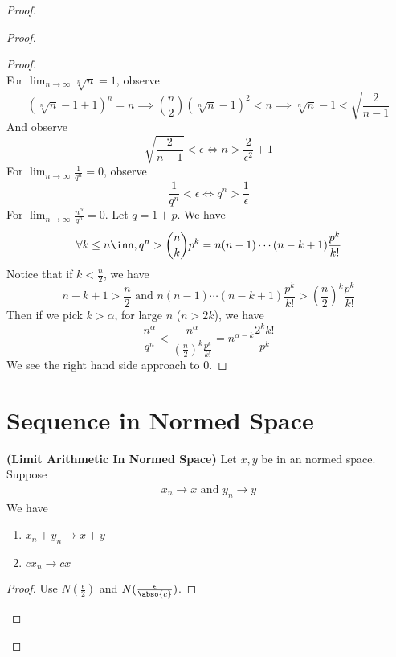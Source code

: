 \documentclass{report}
\begin{document}
\begin{proof}
\begin{proof}
\begin{proof}
\begin{equation*}
\end{equation*}
For $\lim_{n\to\infty}\sqrt[n]{n} =1$, observe
\begin{equation*}
 (\sqrt[n]{n}-1+1)^n=n\implies \binom{n}{2} (\sqrt[n]{n}-1)^2<n\implies \sqrt[n]{n}-1<\sqrt{\frac{2}{n-1}}  
\end{equation*}
And observe
\begin{equation*}
\sqrt{\frac{2}{n-1}}<\epsilon  \iff n>\frac{2}{\epsilon^2}+1  
\end{equation*}
For $\lim_{n\to\infty}\frac{1}{q^n}=0$, observe
\begin{equation*}
\frac{1}{q^n}<\epsilon  \iff  q^n>\frac{1}{\epsilon }
\end{equation*}
For $\lim_{n\to\infty}\frac{n^\alpha }{q^n}=0$. Let $q=1+p$. We have
 \begin{equation*}
\forall k\leq n\inn, q^n>\binom{n}{k}p^k=n(n-1)\cdots (n-k+1) \frac{p^k}{k!}
\end{equation*}
Notice that if $k<\frac{n}{2}$, we have
 \begin{equation*}
n-k+1>\frac{n}{2}\text{ and }n(n-1)\cdots (n-k+1) \frac{p^k}{k!}>(\frac{n}{2})^k \frac{p^k}{k!}
\end{equation*}
Then if we pick $k>\alpha $, for large  $n$  ($n>2k$), we have 
\begin{equation*}
\frac{n^{\alpha }}{q^n}<\frac{n^{\alpha }}{(\frac{n}{2})^k \frac{p^k}{k!}}=n^{\alpha -k}\frac{2^kk!}{p^k}
\end{equation*}
We see the right hand side approach to $0$.
\end{proof}
\section{Sequence in Normed Space} 
\begin{theorem}
\label{4.2.1}
\textbf{(Limit Arithmetic In Normed Space)} Let $x,y$ be in an normed space. Suppose 
\begin{align*}
x_n \to x \text{ and }y_n \to y
\end{align*}
We have 
\begin{enumerate}[label=(\alph*)]
  \item $x_n+y_n \to x+y$ 
  \item  $cx_n \to cx$
\end{enumerate}
\end{theorem}
\begin{proof}
Use $N(\frac{\epsilon }{2})$ and $N(\frac{\epsilon }{\abso{c}})$. 
\end{proof}

\end{proof}
\end{proof}
\end{document}
